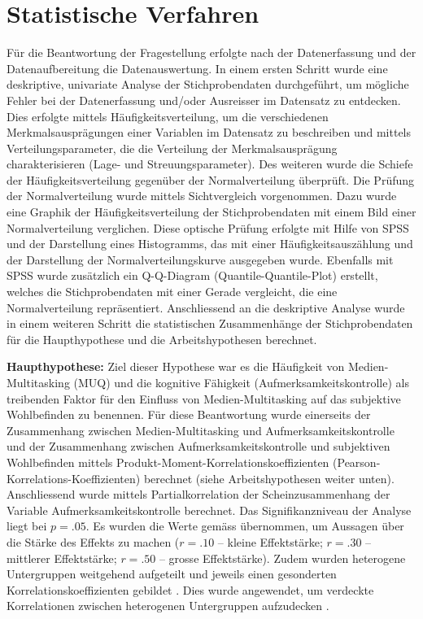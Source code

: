 \section{Statistische Verfahren}\label{section.statistischeVerfahren}
Für die Beantwortung der Fragestellung erfolgte nach der Datenerfassung und der Datenaufbereitung die Datenauswertung. In einem ersten Schritt wurde eine deskriptive, univariate Analyse der Stichprobendaten durchgeführt, um mögliche Fehler bei der Datenerfassung und/oder Ausreisser im Datensatz zu entdecken. Dies erfolgte mittels Häufigkeitsverteilung, um die verschiedenen Merkmalsausprägungen einer Variablen im Datensatz zu beschreiben und mittels Verteilungsparameter, die die Verteilung der Merkmalsausprägung charakterisieren (Lage- und Streuungsparameter). Des weiteren wurde die Schiefe der Häufigkeitsverteilung gegenüber der Normalverteilung überprüft. Die Prüfung der Normalverteilung wurde mittels Sichtvergleich vorgenommen. Dazu wurde eine Graphik der Häufigkeitsverteilung der Stichprobendaten mit einem Bild einer Normalverteilung verglichen. Diese optische Prüfung erfolgte mit Hilfe von SPSS und der Darstellung eines Histogramms, das mit einer Häufigkeitsauszählung und der Darstellung der Normalverteilungskurve ausgegeben wurde. Ebenfalls mit SPSS wurde zusätzlich ein Q-Q-Diagram (Quantile-Quantile-Plot) erstellt, welches die Stichprobendaten mit einer Gerade vergleicht, die eine Normalverteilung repräsentiert. Anschliessend an die deskriptive Analyse wurde in einem weiteren Schritt die statistischen Zusammenhänge der Stichprobendaten für die Haupthypothese und die Arbeitshypothesen berechnet. \par 
\textbf{Haupthypothese:} Ziel dieser Hypothese war es die Häufigkeit von Medien-Multitasking (MUQ) und die kognitive Fähigkeit (Aufmerksamkeitskontrolle) als treibenden Faktor für den Einfluss von Medien-Multitasking auf das subjektive Wohlbefinden zu benennen. Für diese Beantwortung wurde einerseits der Zusammenhang zwischen Medien-Multitasking und Aufmerksamkeitskontrolle und der Zusammenhang zwischen Aufmerksamkeitskontrolle und subjektiven Wohlbefinden mittels Produkt-Moment-Korrelationskoeffizienten (Pearson-Korrelations-Koeffizienten) berechnet (siehe Arbeitshypothesen weiter unten). Anschliessend wurde mittels Partialkorrelation der Scheinzusammenhang der Variable Aufmerksamkeitskontrolle berechnet. Das Signifikanzniveau der Analyse liegt bei $p=.05$. Es wurden die Werte gemäss \cite{Cohen1988} übernommen, um Aussagen über die Stärke des Effekts zu machen ($r=.10$ -- kleine Effektstärke; $r=.30$ -- mittlerer Effektstärke; $r=.50$ -- grosse Effektstärke). Zudem wurden heterogene Untergruppen weitgehend aufgeteilt und jeweils einen gesonderten Korrelationskoeffizienten gebildet \cite{Renkewitz2008}. Dies wurde angewendet, um verdeckte Korrelationen zwischen heterogenen Untergruppen aufzudecken \cite{Ebermann2014}.

